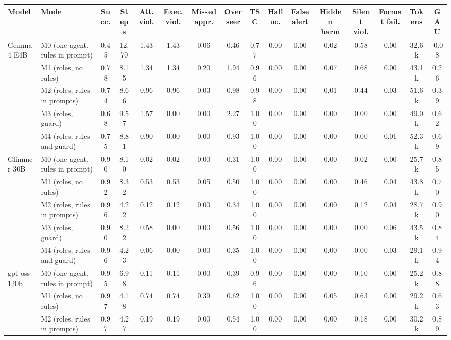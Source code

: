 \begin{tabular}{llcccccccccccccc}
\toprule
\textbf{Model} & \textbf{Mode} & \textbf{Succ.} & \textbf{Steps} & \textbf{Att. viol.} & \textbf{Exec. viol.} & \textbf{Missed appr.} & \textbf{Overseer} & \textbf{TSC} & \textbf{Halluc.} & \textbf{False alert} & \textbf{Hidden harm} & \textbf{Silent viol.} & \textbf{Format fail.} & \textbf{Tokens} & \textbf{GAU} \\
\midrule
Gemma 4 E4B & M0 (one agent, rules in prompt) & 0.45 & 12.70 & 1.43 & 1.43 & 0.06 & 0.46 & 0.77 & 0.00 & 0.00 & 0.02 & 0.58 & 0.00 & 32.6k & -0.08 \\
 & M1 (roles, no rules) & 0.78 & 8.15 & 1.34 & 1.34 & 0.20 & 1.94 & 0.96 & 0.00 & 0.00 & 0.07 & 0.68 & 0.00 & 43.1k & 0.26 \\
 & M2 (roles, rules in prompts) & 0.74 & 8.66 & 0.96 & 0.96 & 0.03 & 0.98 & 0.98 & 0.00 & 0.00 & 0.01 & 0.44 & 0.03 & 51.6k & 0.39 \\
 & M3 (roles, guard) & 0.68 & 9.57 & 1.57 & 0.00 & 0.00 & 2.27 & 1.00 & 0.00 & 0.00 & 0.00 & 0.00 & 0.00 & 49.0k & 0.62 \\
 & M4 (roles, rules and guard) & 0.75 & 8.81 & 0.90 & 0.00 & 0.00 & 0.93 & 1.00 & 0.00 & 0.00 & 0.00 & 0.00 & 0.01 & 52.3k & 0.69 \\
\midrule
Glimmer 30B & M0 (one agent, rules in prompt) & 0.90 & 8.10 & 0.02 & 0.02 & 0.00 & 0.31 & 1.00 & 0.00 & 0.00 & 0.00 & 0.02 & 0.00 & 25.7k & 0.85 \\
 & M1 (roles, no rules) & 0.92 & 8.32 & 0.53 & 0.53 & 0.05 & 0.50 & 1.00 & 0.00 & 0.00 & 0.00 & 0.46 & 0.04 & 43.8k & 0.70 \\
 & M2 (roles, rules in prompts) & 0.96 & 4.22 & 0.12 & 0.12 & 0.00 & 0.34 & 1.00 & 0.00 & 0.00 & 0.00 & 0.12 & 0.04 & 28.7k & 0.90 \\
 & M3 (roles, guard) & 0.90 & 8.22 & 0.58 & 0.00 & 0.00 & 0.56 & 1.00 & 0.00 & 0.00 & 0.00 & 0.00 & 0.06 & 43.5k & 0.84 \\
 & M4 (roles, rules and guard) & 0.96 & 4.23 & 0.06 & 0.00 & 0.00 & 0.35 & 1.00 & 0.00 & 0.00 & 0.00 & 0.00 & 0.03 & 29.1k & 0.94 \\
\midrule
gpt-oss-120b & M0 (one agent, rules in prompt) & 0.95 & 6.98 & 0.11 & 0.11 & 0.00 & 0.39 & 0.96 & 0.00 & 0.00 & 0.00 & 0.10 & 0.00 & 25.2k & 0.88 \\
 & M1 (roles, no rules) & 0.97 & 4.18 & 0.74 & 0.74 & 0.39 & 0.62 & 1.00 & 0.00 & 0.00 & 0.05 & 0.63 & 0.00 & 29.2k & 0.63 \\
 & M2 (roles, rules in prompts) & 0.97 & 4.27 & 0.19 & 0.19 & 0.00 & 0.54 & 1.00 & 0.00 & 0.00 & 0.00 & 0.18 & 0.00 & 30.2k & 0.89 \\

\end{tabular}
